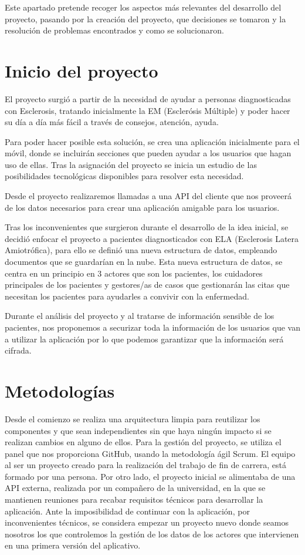 
Este apartado pretende recoger los aspectos más relevantes del desarrollo del proyecto, pasando por la creación del proyecto, que decisiones se tomaron y la resolución de problemas encontrados y como se solucionaron.

\section{Inicio del proyecto}
El proyecto surgió a partir de la necesidad de ayudar a personas diagnosticadas con Esclerosis, tratando inicialmente la EM (Esclerósis Múltiple) y poder hacer su día a día más fácil a través de consejos, atención, ayuda.

Para poder hacer posible esta solución, se crea una aplicación inicialmente para el móvil, donde se incluirán secciones que pueden ayudar a los usuarios que hagan uso de ellas. Tras la asignación del proyecto se inicia un estudio de las posibilidades tecnológicas disponibles para resolver esta necesidad.

Desde el proyecto realizaremos llamadas a una API del cliente que nos proveerá de los datos necesarios para crear una aplicación amigable para los usuarios.

Tras los inconvenientes que surgieron durante el desarrollo de la idea inicial, se decidió enfocar el proyecto a pacientes diagnosticados con ELA (Esclerosis Latera Amiotrófica), para ello se definió una nueva estructura de datos, empleando documentos que se guardarían en la nube. Esta nueva estructura de datos, se centra en un principio en 3 actores que son los pacientes, los cuidadores principales de los pacientes y gestores/as de casos que gestionarán las citas que necesitan los pacientes para ayudarles a convivir con la enfermedad.

Durante el análisis del proyecto y al tratarse de información sensible de los pacientes, nos proponemos a securizar toda la información de los usuarios que van a utilizar la aplicación por lo que podemos garantizar que la información será cifrada.

\section{Metodologías}
Desde el comienzo se realiza una arquitectura limpia para reutilizar los componentes y que sean independientes sin que haya ningún impacto si se realizan cambios en alguno de ellos.
Para la gestión del proyecto, se utiliza el panel que nos proporciona GitHub, usando la metodología ágil Scrum. El equipo al ser un proyecto creado para la realización del trabajo de fin de carrera, está formado por una persona. 
Por otro lado, el proyecto inicial se alimentaba de una API externa, realizada por un compañero de la universidad, en la que se mantienen reuniones para recabar requisitos técnicos para desarrollar la aplicación. Ante la imposibilidad de continuar con la aplicación, por inconvenientes técnicos, se considera empezar un proyecto nuevo donde seamos nosotros los que controlemos la gestión de los datos de los actores que intervienen en una primera versión del aplicativo.

